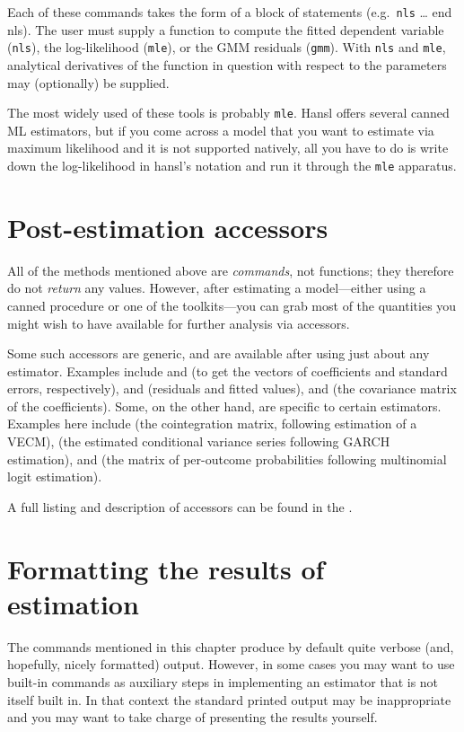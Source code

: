 Each of these commands takes the form of a block of statements (e.g.\
\texttt{nls} \dots{} \textrm{end nls}). The user must supply a
function to compute the fitted dependent variable (\texttt{nls}), the
log-likelihood (\texttt{mle}), or the GMM residuals
(\texttt{gmm}). With \texttt{nls} and \texttt{mle}, analytical
derivatives of the function in question with respect to the parameters
may (optionally) be supplied.

The most widely used of these tools is probably \texttt{mle}. Hansl
offers several canned ML estimators, but if you come across a model
that you want to estimate via maximum likelihood and it is not
supported natively, all you have to do is write down the
log-likelihood in hansl's notation and run it through the \texttt{mle}
apparatus.

\section{Post-estimation accessors}
\label{sec:postest-accessors}

All of the methods mentioned above are \textit{commands}, not
functions; they therefore do not \textit{return} any values. However,
after estimating a model---either using a canned procedure or one of
the toolkits---you can grab most of the quantities you might wish to
have available for further analysis via accessors.

Some such accessors are generic, and are available after using just
about any estimator. Examples include \dollar{coeff} and
 (to get the vectors of coefficients and standard
errors, respectively), \dollar{uhat} and \dollar{yhat} (residuals and
fitted values), and \dollar{vcv} (the covariance matrix of the
coefficients). Some, on the other hand, are specific to certain
estimators. Examples here include  (the cointegration
matrix, following estimation of a VECM), \dollar{h} (the estimated
conditional variance series following GARCH estimation), and
 (the matrix of per-outcome probabilities following
multinomial logit estimation).

A full listing and description of accessors can be found in the
\GCR.

\section{Formatting the results of estimation}
\label{sec:model-format}

The commands mentioned in this chapter produce by default quite
verbose (and, hopefully, nicely formatted) output. However, in some
cases you may want to use built-in commands as auxiliary steps in
implementing an estimator that is not itself built in. In that context
the standard printed output may be inappropriate and you may want to
take charge of presenting the results yourself. 


